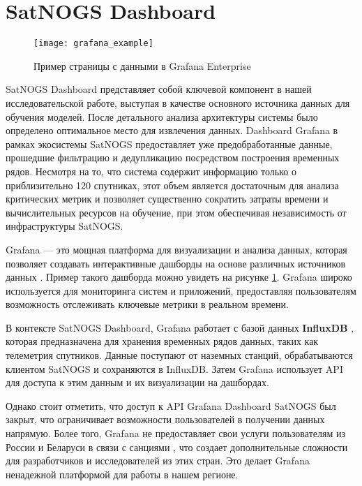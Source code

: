 \section{SatNOGS Dashboard}

\begin{figure}[htbp]
	\centering
	\texttt{[image: grafana\_example]}
	\caption{Пример страницы с данными в Grafana Enterprise}
	\label{fig:grafana_example}
\end{figure}

SatNOGS Dashboard представляет собой ключевой компонент в нашей
исследовательской работе, выступая в качестве основного источника данных для
обучения моделей. После детального анализа архитектуры системы было определено
оптимальное место для извлечения данных. Dashboard Grafana в рамках экосистемы
SatNOGS предоставляет уже предобработанные данные, прошедшие фильтрацию и
дедупликацию посредством построения временных рядов. Несмотря на то, что
система содержит информацию только о приблизительно 120 спутниках, этот объем
является достаточным для анализа критических метрик и позволяет существенно
сократить затраты времени и вычислительных ресурсов на обучение, при этом
обеспечивая независимость от инфраструктуры SatNOGS.

Grafana — это мощная платформа для визуализации и анализа данных, которая
позволяет создавать интерактивные дашборды на основе различных источников
данных \cite{grafana_docs}. Пример такого дашборда можно увидеть на рисунке
\ref{fig:grafana_example}.
Grafana широко используется для мониторинга систем и приложений, предоставляя
пользователям возможность отслеживать ключевые метрики в реальном времени.

В контексте SatNOGS Dashboard, Grafana работает с базой данных
\textbf{InfluxDB} \cite{influxdb_docs}, которая предназначена для хранения
временных рядов данных, таких как телеметрия спутников. Данные поступают от
наземных станций, обрабатываются клиентом SatNOGS и сохраняются в InfluxDB.
Затем Grafana использует API для доступа к этим данным и их визуализации на
дашбордах.

Однако стоит отметить, что доступ к API Grafana Dashboard SatNOGS был закрыт,
что ограничивает возможности пользователей в получении данных напрямую. Более
того, Grafana не предоставляет свои услуги пользователям из России и Беларуси в
связи с санциями \cite{grafana_community_post}, что создает дополнительные
сложности для разработчиков и исследователей из этих стран. Это делает Grafana
ненадежной платформой для работы в нашем регионе.

